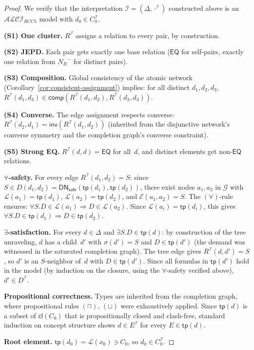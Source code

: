 \documentclass[a4paper,11pt]{article}
\theoremstyle{definition}
\newcommand{\ALCIRCC}[1]{\ensuremath{\mathcal{ALCI}_{\mathit{RCC#1}}}}
\newcommand{\NR}{\ensuremath{N_R}}
\newcommand{\interp}{\ensuremath{\mathcal{I}}}
\newcommand{\EQ}{\ensuremath{\mathsf{EQ}}}
\newcommand{\inv}{\ensuremath{\mathsf{inv}}}
\newcommand{\comp}{\ensuremath{\mathsf{comp}}}
\newcommand{\cl}{\ensuremath{\mathsf{cl}}}
\newcommand{\DN}{\ensuremath{\mathsf{DN}}}
\begin{document}
\begin{proof}
We verify that the interpretation $\interp = (\Delta,
\cdot^{\interp})$ constructed above is an $\ALCIRCC{5}$ model with
$d_0 \in C_0^{\interp}$.

\medskip
\noindent\textbf{(S1) One cluster.}\;
$R^{\interp}$ assigns a relation to every pair, by construction.

\medskip
\noindent\textbf{(S2) JEPD.}\;
Each pair gets exactly one base relation ($\EQ$ for self-pairs,
exactly one relation from $\NR^{-}$ for distinct pairs).

\medskip
\noindent\textbf{(S3) Composition.}\;
Global consistency of the atomic network (Corollary~\ref{cor:consistent-assignment})
implies: for all distinct $d_1, d_2, d_3$,
$R^{\interp}(d_1, d_3) \in \comp(R^{\interp}(d_1, d_2),
R^{\interp}(d_2, d_3))$.

\medskip
\noindent\textbf{(S4) Converse.}\;
The edge assignment respects converse: $R^{\interp}(d_2, d_1) =
\inv(R^{\interp}(d_1, d_2))$ (inherited from the disjunctive network's
converse symmetry and the completion graph's converse constraint).

\medskip
\noindent\textbf{(S5) Strong EQ.}\;
$R^{\interp}(d, d) = \EQ$ for all~$d$, and distinct elements get
non-$\EQ$ relations.

\medskip
\noindent\textbf{$\forall$-safety.}\;
For every edge $R^{\interp}(d_1, d_2) = S$:
since $S \in D(d_1, d_2) = \DN_{\mathsf{safe}}(\mathsf{tp}(d_1),
\mathsf{tp}(d_2))$, there exist nodes $a_1, a_2$ in $\mathcal{G}$
with $\mathcal{L}(a_1) = \mathsf{tp}(d_1)$, $\mathcal{L}(a_2) =
\mathsf{tp}(d_2)$, and $\mathcal{E}(a_1, a_2) = S$.  The
$(\forall)$-rule ensures: $\forall S.D \in \mathcal{L}(a_1)
\Rightarrow D \in \mathcal{L}(a_2)$.  Since $\mathcal{L}(a_i) =
\mathsf{tp}(d_i)$, this gives $\forall S.D \in \mathsf{tp}(d_1)
\Rightarrow D \in \mathsf{tp}(d_2)$.

\medskip
\noindent\textbf{$\exists$-satisfaction.}\;
For every $d \in \Delta$ and $\exists S.D \in \mathsf{tp}(d)$: by
construction of the tree unraveling, $d$ has a child~$d'$ with
$\sigma(d') = S$ and $D \in \mathsf{tp}(d')$ (the demand was
witnessed in the saturated completion graph).  The tree edge gives
$R^{\interp}(d, d') = S$, so $d'$ is an $S$-neighbor of~$d$ with
$D \in \mathsf{tp}(d')$.  Since all formulas in $\mathsf{tp}(d')$
hold in the model (by induction on the closure, using the
$\forall$-safety verified above), $d' \in D^{\interp}$.

\medskip
\noindent\textbf{Propositional correctness.}\;
Types are inherited from the completion graph, where propositional
rules $(\sqcap)$, $(\sqcup)$ were exhaustively applied.  Since
$\mathsf{tp}(d)$ is a subset of $\cl(C_0)$ that is
propositionally closed and clash-free, standard induction on concept
structure shows $d \in E^{\interp}$ for every $E \in \mathsf{tp}(d)$.

\medskip
\noindent\textbf{Root element.}\;
$\mathsf{tp}(d_0) = \mathcal{L}(x_0) \ni C_0$, so $d_0 \in
C_0^{\interp}$.
\end{proof}
\end{document}
